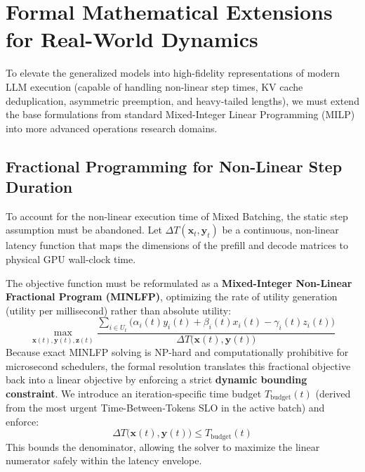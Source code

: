 \documentclass[11pt]{article}
\begin{document}
\section{Formal Mathematical Extensions for Real-World Dynamics}
\label{sec:formal_extensions}

To elevate the generalized models into high-fidelity representations of modern LLM execution (capable of handling non-linear step times, KV cache deduplication, asymmetric preemption, and heavy-tailed lengths), we must extend the base formulations from standard Mixed-Integer Linear Programming (MILP) into more advanced operations research domains.

\subsection{Fractional Programming for Non-Linear Step Duration}
\label{subsec:ext_fractional_programming}

To account for the non-linear execution time of Mixed Batching, the static step assumption must be abandoned. Let $\Delta T(\mathbf{x}_t, \mathbf{y}_t)$ be a continuous, non-linear latency function that maps the dimensions of the prefill and decode matrices to physical GPU wall-clock time. 

The objective function must be reformulated as a \textbf{Mixed-Integer Non-Linear Fractional Program (MINLFP)}, optimizing the rate of utility generation (utility per millisecond) rather than absolute utility:
\begin{equation}
\label{eq:fractional_ilp}
    \max_{\mathbf{x}(t), \mathbf{y}(t), \mathbf{z}(t)} \frac{\sum_{i \in U_t} \Big( \alpha_i(t) y_i(t) + \beta_i(t) x_i(t) - \gamma_i(t) z_i(t) \Big)}{\Delta T\big(\mathbf{x}(t), \mathbf{y}(t)\big)}
\end{equation}
Because exact MINLFP solving is NP-hard and computationally prohibitive for microsecond schedulers, the formal resolution translates this fractional objective back into a linear objective by enforcing a strict \textbf{dynamic bounding constraint}. We introduce an iteration-specific time budget $T_{\text{budget}}(t)$ (derived from the most urgent Time-Between-Tokens SLO in the active batch) and enforce:
\begin{equation}
    \Delta T\big(\mathbf{x}(t), \mathbf{y}(t)\big) \le T_{\text{budget}}(t)
\end{equation}
This bounds the denominator, allowing the solver to maximize the linear numerator safely within the latency envelope.
\end{document}
